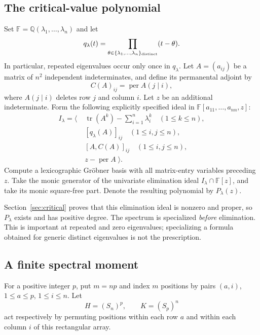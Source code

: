 \documentclass[11pt]{article}
\newcommand{\per}{\operatorname{per}}
\newcommand{\tr}{\operatorname{tr}}
\newcommand{\F}{\mathbb F}
\newcommand{\Q}{\mathbb Q}
\theoremstyle{definition}\newtheorem{definition}[theorem]{Definition}
\theoremstyle{remark}\newtheorem{remark}[theorem]{Remark}
\begin{document}
\subsection{The critical-value polynomial}
Set $\F=\Q(\lambda_1,\ldots,\lambda_n)$ and let
\[
 q_\lambda(t)=\prod_{\theta\in\{\lambda_1,\ldots,\lambda_n\}_{\rm distinct}}(t-\theta).
\]
In particular, repeated eigenvalues occur only once in $q_\lambda$. Let $A=(a_{ij})$ be a matrix of $n^2$ independent indeterminates, and define its permanental adjoint by
\[
 C(A)_{ij}=\per A(j\mid i),
\]
where $A(j\mid i)$ deletes row $j$ and column $i$. Let $z$ be an additional indeterminate. Form the following explicitly specified ideal in $\F[a_{11},\ldots,a_{nn},z]$:
\begin{equation}\label{eq:ideal}
\begin{split}
 I_\lambda=\Big\langle\;&\tr(A^k)-\sum_{i=1}^n\lambda_i^k\quad(1\leq k\leq n),\\
 &[q_\lambda(A)]_{ij}\quad(1\leq i,j\leq n),\\
 &[A,C(A)]_{ij}\quad(1\leq i,j\leq n),\\
 &z-\per A\;\Big\rangle.
\end{split}
\end{equation}
Compute a lexicographic Gr\"obner basis with all matrix-entry variables preceding $z$. Take the monic generator of the univariate elimination ideal $I_\lambda\cap\F[z]$, and take its monic square-free part. Denote the resulting polynomial by $P_\lambda(z)$.

Section~\ref{sec:critical} proves that this elimination ideal is nonzero and proper, so $P_\lambda$ exists and has positive degree. The spectrum is specialized \emph{before} elimination. This is important at repeated and zero eigenvalues; specializing a formula obtained for generic distinct eigenvalues is not the prescription.

\subsection{A finite spectral moment}
For a positive integer $p$, put $m=np$ and index $m$ positions by pairs $(a,i)$, $1\leq a\leq p$, $1\leq i\leq n$. Let
\[
 H=(S_n)^p,\qquad K=(S_p)^n
\]
act respectively by permuting positions within each row $a$ and within each column $i$ of this rectangular array.
\end{document}

